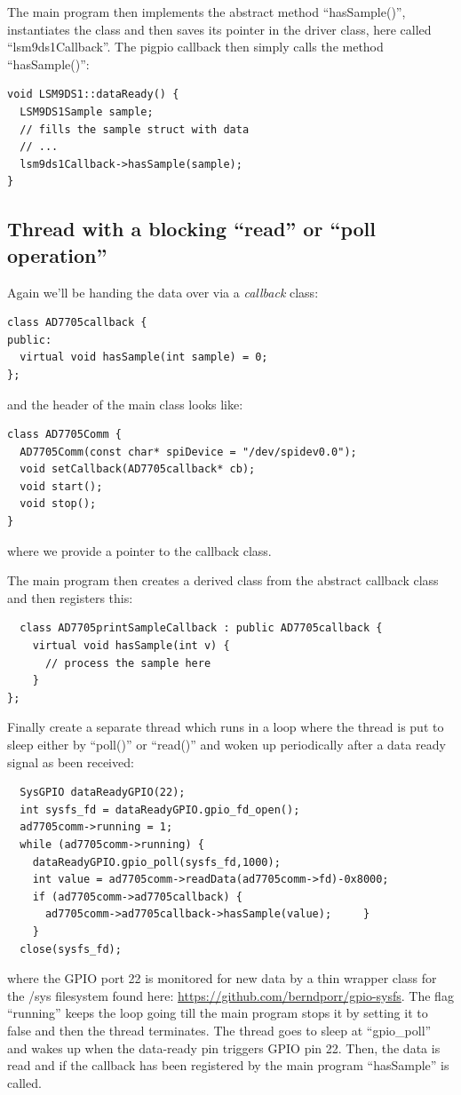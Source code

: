 \documentclass[12pt]{article}
\begin{document}
The main program then implements the abstract method ``hasSample()'', instantiates
the class and then saves its pointer in the driver class, here called ``lsm9ds1Callback''.
The pigpio callback then simply calls the method ``hasSample()'':
\begin{verbatim}
void LSM9DS1::dataReady() {
  LSM9DS1Sample sample;
  // fills the sample struct with data
  // ...
  lsm9ds1Callback->hasSample(sample);
}
\end{verbatim}

\subsection{Thread with a blocking ``read'' or ``poll operation''}
Again we'll be handing the data over via a \textsl{callback} class:
\begin{verbatim}
class AD7705callback {
public:
  virtual void hasSample(int sample) = 0;
};
\end{verbatim}

and the header of the main class looks like:
\begin{verbatim}
class AD7705Comm {
  AD7705Comm(const char* spiDevice = "/dev/spidev0.0");
  void setCallback(AD7705callback* cb);
  void start();
  void stop();
}
\end{verbatim}
where we provide a pointer to the callback class.

The main program then creates a derived class from the
abstract callback class and then registers this:
\begin{verbatim}
  class AD7705printSampleCallback : public AD7705callback {
    virtual void hasSample(int v) {
      // process the sample here
    }
};
\end{verbatim}

Finally create a separate thread which runs in a loop
where the thread is put to sleep either by ``poll()'' or ``read()''
and woken up periodically after a data ready
signal as been received:
\begin{verbatim}
  SysGPIO dataReadyGPIO(22);
  int sysfs_fd = dataReadyGPIO.gpio_fd_open();	
  ad7705comm->running = 1;
  while (ad7705comm->running) {
    dataReadyGPIO.gpio_poll(sysfs_fd,1000);
    int value = ad7705comm->readData(ad7705comm->fd)-0x8000;
    if (ad7705comm->ad7705callback) {
      ad7705comm->ad7705callback->hasSample(value);		}
    }
  close(sysfs_fd);
\end{verbatim}
where the GPIO port 22 is monitored for new data by a thin wrapper class for the /sys filesystem
found here: \url{https://github.com/berndporr/gpio-sysfs}. The flag ``running'' keeps
the loop going till the main program stops it by setting it to false and then the thread
terminates. The thread goes to sleep at ``gpio\_poll'' and wakes up when the data-ready
pin triggers GPIO pin 22. Then, the data is read and if the callback has been registered
by the main program ``hasSample'' is called.
\end{document}
